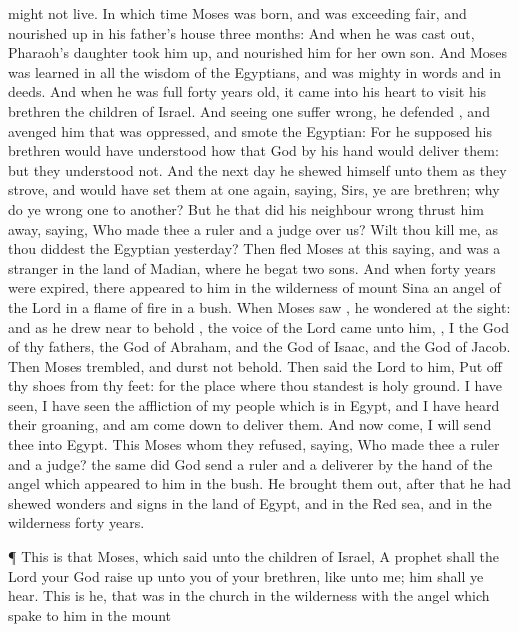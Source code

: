 {might
not
live.
In
which
time
Moses was
born,
and
was
exceeding
fair,
and
nourished up
in
his
father’s
house
three
months:
And
when
he was cast
out,
Pharaoh’s
daughter
took
him up, and
nourished
him
for her
own
son.
And
Moses was
learned in
all the
wisdom of the
Egyptians,
and
was
mighty
in
words
and
in
deeds.
And
when
he was
full forty
years
old, it
came
into
his
heart to
visit
his
brethren the
children of
Israel.
And
seeing
one
{} suffer
wrong, he
defended
{},
and
avenged him that was
oppressed,
and
smote the
Egyptian:
For he
supposed
his
brethren would have
understood how
that
God
by
his
hand would
deliver
them:
but they
understood
not.
And the
next
day he shewed
himself unto
them as they
strove,
and would have
set
them
at
one
again,
saying,
Sirs,
ye
are
brethren;
why do ye
wrong one to
another?
But he that
did his
neighbour
wrong
thrust
him
away,
saying,
Who
made
thee a
ruler
and a
judge
over
us?
Wilt
thou
kill
me,
as
thou
diddest the
Egyptian
yesterday?
Then
fled
Moses
at
this
saying,
and
was a
stranger
in the
land of
Madian,
where he
begat
two
sons.
And
when
forty
years were
expired, there
appeared to
him
in the
wilderness of
mount
Sina an
angel of the
Lord
in a
flame of
fire in a
bush.
When
Moses
saw
{}, he
wondered at the
sight:
and as he drew
near to
behold
{}, the
voice of the
Lord
came
unto
him,
,
I
{} the
God
of
thy
fathers, the
God of
Abraham,
and the
God of
Isaac,
and the
God of
Jacob.
Then
Moses
trembled, and
durst
not
behold.
Then
said the
Lord to
him, Put
off
thy
shoes
from
thy
feet:
for the
place
where thou
standest
is
holy
ground.
I have
seen, I have
seen the
affliction
of
my
people
which is
in
Egypt,
and I have
heard
their
groaning,
and am come
down to
deliver
them.
And
now
come, I will
send
thee
into
Egypt.
This
Moses
whom they
refused,
saying,
Who
made
thee a
ruler
and a
judge? the
same
did
God
send
{} a
ruler
and a
deliverer
by the
hand of the
angel
which
appeared to
him
in the
bush.
He
brought
them
out, after that he had
shewed
wonders
and
signs
in the
land of
Egypt,
and
in
the Red
sea,
and
in the
wilderness
forty
years.
\par }{\PP {}¶
This
is
that
Moses, which
said unto the
children of
Israel, A
prophet
shall the
Lord
your
God raise
up unto
you
of
your
brethren,
like unto
me;
him shall ye
hear.
This
is he, that
was
in the
church
in the
wilderness
with the
angel
which
spake to
him
in the
mount
}
